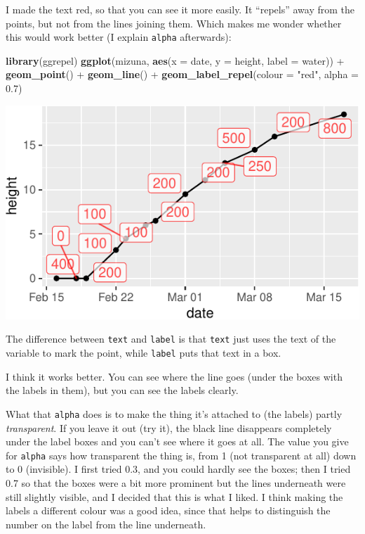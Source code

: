 \documentclass[]{tufte-book}
\newenvironment{Shaded}{}{}
\newcommand{\DataTypeTok}[1]{\textcolor[rgb]{0.56,0.13,0.00}{#1}}
\newcommand{\FloatTok}[1]{\textcolor[rgb]{0.25,0.63,0.44}{#1}}
\newcommand{\KeywordTok}[1]{\textcolor[rgb]{0.00,0.44,0.13}{\textbf{#1}}}
\newcommand{\NormalTok}[1]{#1}
\newcommand{\OperatorTok}[1]{\textcolor[rgb]{0.40,0.40,0.40}{#1}}
\newcommand{\StringTok}[1]{\textcolor[rgb]{0.25,0.44,0.63}{#1}}
\theoremstyle{definition}
\theoremstyle{definition}
\theoremstyle{definition}
\theoremstyle{remark}
\begin{document}
I made the text red, so that you can see it more easily. It ``repels''
away from the points, but not from the lines joining them. Which makes
me wonder whether this would work better (I explain \texttt{alpha}
afterwards):

\begin{Shaded}
\begin{Highlighting}[]
\KeywordTok{library}\NormalTok{(ggrepel)}
\KeywordTok{ggplot}\NormalTok{(mizuna, }\KeywordTok{aes}\NormalTok{(}\DataTypeTok{x =}\NormalTok{ date, }\DataTypeTok{y =}\NormalTok{ height, }\DataTypeTok{label =}\NormalTok{ water)) }\OperatorTok{+}\StringTok{ }
\StringTok{    }\KeywordTok{geom_point}\NormalTok{() }\OperatorTok{+}\StringTok{ }\KeywordTok{geom_line}\NormalTok{() }\OperatorTok{+}\StringTok{ }\KeywordTok{geom_label_repel}\NormalTok{(}\DataTypeTok{colour =} \StringTok{"red"}\NormalTok{, }
    \DataTypeTok{alpha =} \FloatTok{0.7}\NormalTok{)}
\end{Highlighting}
\end{Shaded}

\includegraphics{13-dates-and-times_files/figure-latex/unnamed-chunk-15-1}

The difference between \texttt{text} and \texttt{label} is that
\texttt{text} just uses the text of the variable to mark the point,
while \texttt{label} puts that text in a box.

I think it works better. You can see where the line goes (under the
boxes with the labels in them), but you can see the labels clearly.

What that \texttt{alpha} does is to make the thing it's attached to (the
labels) partly \emph{transparent}. If you leave it out (try it), the
black line disappears completely under the label boxes and you can't see
where it goes at all. The value you give for \texttt{alpha} says how
transparent the thing is, from 1 (not transparent at all) down to 0
(invisible). I first tried 0.3, and you could hardly see the boxes; then
I tried 0.7 so that the boxes were a bit more prominent but the lines
underneath were still slightly visible, and I decided that this is what
I liked. I think making the labels a different colour was a good idea,
since that helps to distinguish the number on the label from the line
underneath.
\end{document}
